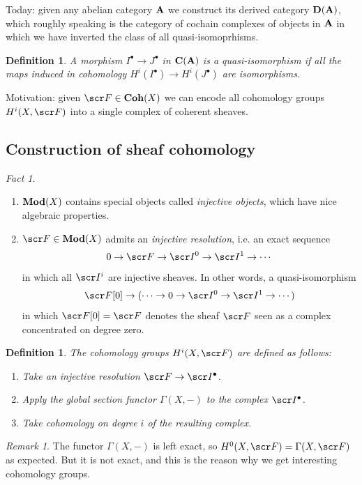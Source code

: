 \documentclass[A4paper, british]{amsart}
\theoremstyle{darkgreentheorem}
\theoremstyle{darkbluedefinition}
\newtheorem{defn}[thm]{Definition}
\theoremstyle{darkredexample}
\theoremstyle{remark}
\newtheorem{rem}[thm]{Remark}
\newtheorem{fact}[thm]{Fact}
\newcommand{\1}{\mathbbm{1}}
\newcommand{\grd}{^{\bullet}}
\begin{document}
Today: given any abelian category $\mathbf{A}$ we construct its derived category $\mathbf{D}(\mathbf{A})$, which roughly speaking is the category of cochain complexes of objects in $\mathbf{A}$ in which we have inverted the class of all quasi-isomoprhisms.

\begin{defn}
    A morphism $I\grd\to J\grd$ in $\mathbf{C}(\mathbf{A})$ is a quasi-isomorphism if all the maps induced in cohomology $H^{i}(I\grd)\to H^{i}(J\grd)$ are isomorphisms.
\end{defn}

Motivation: given $\F\in \Coh(X)$ we can encode all cohomology groups $H^{i}(X,\F)$ into a single complex of coherent sheaves.

\subsection{Construction of sheaf cohomology}

\begin{fact}
    \begin{enumerate}
	\item $\mathbf{Mod}(X)$ contains special objects called \textit{injective objects}, which have nice algebraic properties.
	\item $\F\in \Mod(X)$ admits an \textit{injective resolution}, i.e. an exact sequence
	    \[ 0\to \F\to \I^{0}\to\I^{1}\to \cdots \]
	    in which all $\I^{i}$ are injective sheaves.
	    In other words, a quasi-isomorphism
	    \[ \F[0]\to (\cdots \to 0\to \I^{0}\to \I^{1}\to \cdots) \]
	    in which $\F[0]=\F$ denotes the sheaf $\F$ seen as a complex concentrated on degree zero.
    \end{enumerate}
\end{fact}

\begin{defn}
    The cohomology groups $H^{i}(X,\F)$ are defined as follows:
    \begin{enumerate}
	\item Take an injective resolution $\F\to \I\grd$.
	\item Apply the global section functor $\Gamma(X,-)$ to the complex $\I\grd$.
	\item Take cohomology on degree $i$ of the resulting complex.
    \end{enumerate}
\end{defn}

\begin{rem}
    The functor $\Gamma(X,-)$ is left exact, so $H^{0}(X,\F)=\Gamma(X,\F)$ as expected.
    But it is not exact, and this is the reason why we get interesting cohomology groups.
\end{rem}
\end{document}
